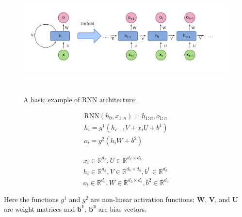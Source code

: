 \documentclass[a4paper, 11pt]{article}
\begin{document}

\begin{figure}[htpb!]
    \centering
    \includegraphics[width=\textwidth,height=6cm,keepaspectratio=true]
    {Recurrent_neural_network_unfold.png}
    \caption{
        A basic example of RNN architecture \parencite{WikipediaEN_RNN_unfold}.
    }
    \label{fig:A basic RNN architecture}
\end{figure}

\begin{align*}
\mathrm{RNN}(h_0,x_{1:n}) = h_{1:n}, o_{1:n} \\
h_i = g^1(h_{i-1}V + x_iU + b^1) \\
o_i = g^2(h_iW + b^2) 
\end{align*}

\begin{align*}
x_i \in \mathbb{R}^{d_x}, U \in \mathbb{R}^{d_x \times d_h} \\
h_i \in \mathbb{R}^{d_h}, V \in \mathbb{R}^{d_h \times d_h}, b^1 \in \mathbb{R}^{d_h} \\
o_i \in \mathbb{R}^{d_o}, W \in \mathbb{R}^{d_h \times d_o}, b^2 \in \mathbb{R}^{d_o}
\end{align*}

Here the functions $g^{1}$ and $g^{2}$ are non-linear activation functions; $\mathbf{W}$, $\mathbf{V}$, and $\mathbf{U}$ are weight matrices and $\mathbf{b^{1}}$, $\mathbf{b^{2}}$ are bias vectors. 
\end{document}
